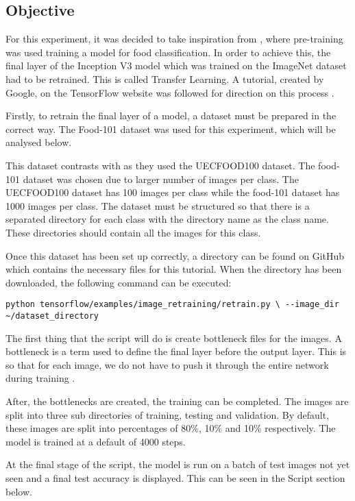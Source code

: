 \tocless\subsection{Objective}
For this experiment, it was decided to take inspiration from
\parencite{yanaiFood}, where pre-training was used training a model for food
classification. In order to achieve this, the final layer of the
Inception V3 model which was trained on the ImageNet dataset had to be retrained. This is called
Transfer Learning.
A tutorial, created by Google, on the TensorFlow website was followed
for direction on this process \parencite{retrainInception}.

Firstly, to retrain the final layer of a model, a dataset must be
prepared in the correct way. The Food-101 dataset \parencite{food101}
was used for this experiment, which will be analysed below.

This dataset contrasts with \parencite{yanaiFood} as they used the UECFOOD100 dataset.
The food-101 dataset was chosen due to larger number of images per class.
The UECFOOD100 dataset has 100 images per class while the food-101 dataset has 1000 images per class.
The dataset must be structured so that
there is a separated directory for each class with the directory name as the class
name. These directories should contain all the images for this class. 

Once this dataset has been set up correctly, a directory can be found on GitHub
which contains the necessary files for this tutorial. When the directory has
been downloaded, the following command can be executed:
\begin{lstlisting}[style=Command]
python tensorflow/examples/image_retraining/retrain.py \ --image_dir
~/dataset_directory
\end{lstlisting}

The first thing that the script will do is create bottleneck files for the
images. A bottleneck is a term used to define the final layer before the output
layer. This is so that for each image, we do not have to push it through the
entire network during training \parencite{retrainInception}.

After, the bottlenecks are created, the training can be completed. The images
are split into three sub directories of training, testing and validation. By
default, these images are split into percentages of 80\%, 10\% and 10\%
respectively. The model is trained at a default of 4000 steps. 

At the final stage of the script, the model is run on a batch of test images not
yet seen and a final test accuracy is displayed. This can be seen in the Script
section below.

